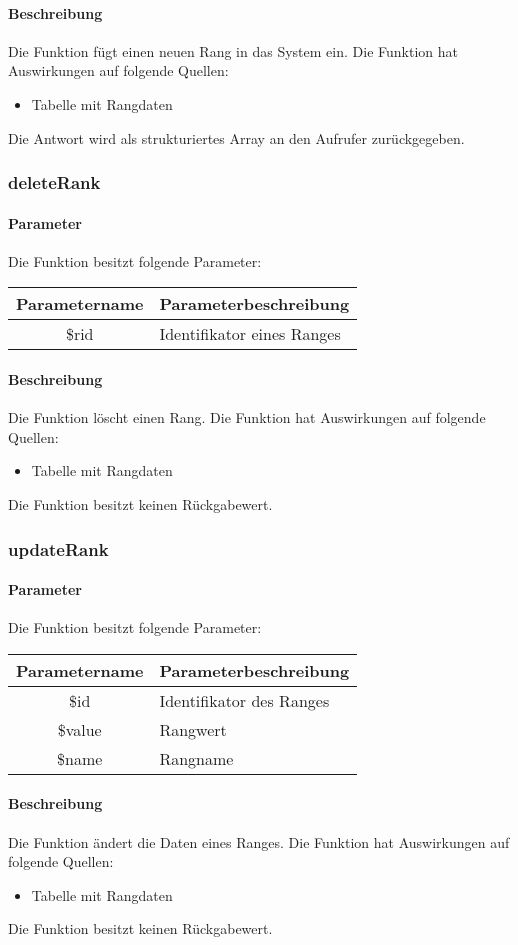 \paragraph{Beschreibung} Die Funktion fügt einen neuen Rang in das System ein. Die Funktion hat Auswirkungen auf folgende Quellen:
\begin{itemize}
	\item Tabelle mit Rangdaten
\end{itemize}
Die Antwort wird als strukturiertes Array an den Aufrufer zurückgegeben.
\subsubsection{deleteRank}
\paragraph{Parameter} Die Funktion besitzt folgende Parameter:
\begin{table}[H]
	\begin{tabular}{|c|p{11cm}|}
		\hline
		\textbf{Parametername} & \textbf{Parameterbeschreibung} \\ \hline
		\$rid & Identifikator eines Ranges \\ \hline
	\end{tabular}
\end{table}
\paragraph{Beschreibung} Die Funktion löscht einen Rang. Die Funktion hat Auswirkungen auf folgende Quellen:
\begin{itemize}
	\item Tabelle mit Rangdaten
\end{itemize}
Die Funktion besitzt keinen Rückgabewert.
\subsubsection{updateRank}
\paragraph{Parameter} Die Funktion besitzt folgende Parameter:
\begin{table}[H]
	\begin{tabular}{|c|p{11cm}|}
		\hline
		\textbf{Parametername} & \textbf{Parameterbeschreibung} \\ \hline
		\$id    & Identifikator des Ranges \\ \hline
		\$value & Rangwert \\ \hline
		\$name  & Rangname \\ \hline
	\end{tabular}
\end{table}
\paragraph{Beschreibung} Die Funktion ändert die Daten eines Ranges. Die Funktion hat Auswirkungen auf folgende Quellen:
\begin{itemize}
	\item Tabelle mit Rangdaten
\end{itemize}
Die Funktion besitzt keinen Rückgabewert.